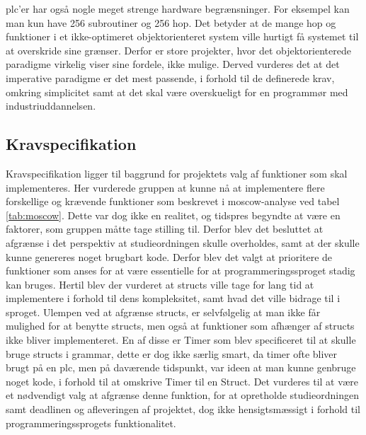 \noindent \Gls{plc}'er har også nogle meget strenge hardware begrænsninger. For eksempel kan man kun have 256 subroutiner og 256 hop. Det betyder at de mange hop og funktioner i et ikke-optimeret objektorienteret system ville hurtigt få systemet til at overskride sine grænser. Derfor er store projekter, hvor det objektorienterede paradigme virkelig viser sine fordele, ikke mulige. Derved vurderes det at det imperative paradigme er det mest passende, i forhold til de definerede krav, omkring simplicitet samt at det skal være overskueligt for en programmør med industriuddannelsen.

\subsection*{Kravspecifikation}
Kravspecifikation ligger til baggrund for projektets valg af funktioner som skal implementeres.
Her vurderede gruppen at kunne nå at implementere flere forskellige og krævende funktioner som beskrevet i \gls{moscow}-analyse ved tabel \ref{tab:moscow}.
Dette var dog ikke en realitet, og tidspres begyndte at være en faktorer, som gruppen måtte tage stilling til.
Derfor blev det besluttet at afgrænse i det perspektiv at studieordningen skulle overholdes, samt at der skulle kunne genereres noget brugbart kode.
Derfor blev det valgt at prioritere de funktioner som anses for at være essentielle for at programmeringssproget stadig kan bruges. Hertil blev der vurderet at structs ville tage for lang tid at implementere i forhold til dens kompleksitet, samt hvad det ville bidrage til i sproget.
Ulempen ved at afgrænse structs, er selvfølgelig at man ikke får mulighed for at benytte structs, men også at funktioner som afhænger af structs ikke bliver implementeret.
En af disse er Timer som blev specificeret til at skulle bruge structs i grammar, dette er dog ikke særlig smart, da timer ofte bliver brugt på en \gls{plc}, men på daværende tidspunkt, var ideen at man kunne genbruge noget kode, i forhold til at omskrive Timer til en Struct.
Det vurderes til at være et nødvendigt valg at afgrænse denne funktion, for at opretholde studieordningen samt deadlinen og afleveringen af projektet, dog ikke hensigtsmæssigt i forhold til programmeringssprogets funktionalitet.\\

